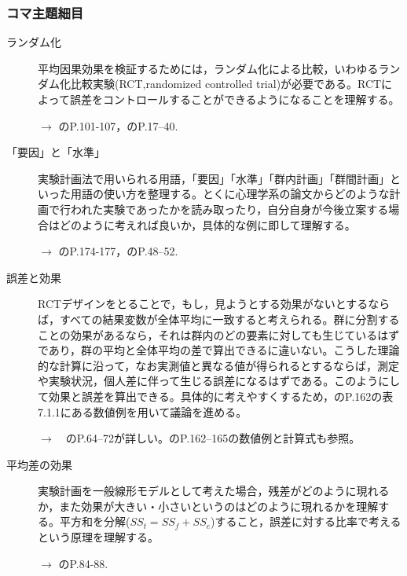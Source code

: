 \subsubsection{コマ主題細目}
\begin{description}
	\item[ランダム化]平均因果効果を検証するためには，ランダム化による比較，いわゆるランダム化比較実験(RCT,randomized controlled trial)が必要である。RCTによって誤差をコントロールすることができるようになることを理解する。
	      \begin{flushright}
		      $\to$ \citet{Nishiuchi201301}のP.101-107，\citet{Ohmura201301}のP.17--40.
	      \end{flushright}

	\item[「要因」と「水準」]実験計画法で用いられる用語，「要因」「水準」「群内計画」「群間計画」といった用語の使い方を整理する。とくに心理学系の論文からどのような計画で行われた実験であったかを読み取ったり，自分自身が今後立案する場合はどのように考えれば良いか，具体的な例に即して理解する。
	      \begin{flushright}
		      $\to$ \citet{Yamada2004}のP.174-177，\citet{Ohmura201301}のP.48--52.
	      \end{flushright}

	\item[誤差と効果]RCTデザインをとることで，もし，見ようとする効果がないとするならば，すべての結果変数が全体平均に一致すると考えられる。群に分割することの効果があるなら，それは群内のどの要素に対しても生じているはずであり，群の平均と全体平均の差で算出できるに違いない。こうした理論的な計算に沿って，なお実測値と異なる値が得られるとするならば，測定や実験状況，個人差に伴って生じる誤差になるはずである。このようにして効果と誤差を算出できる。具体的に考えやすくするため，\citet{Yamada2004}のP.162の表7.1.1にある数値例を用いて議論を進める。
	      \begin{flushright}
		      $\to$　\citet{Ohmura201301}のP.64--72が詳しい。\citet{Yamada2004}のP.162--165の数値例と計算式も参照。
	      \end{flushright}

	\item[平均差の効果]実験計画を一般線形モデルとして考えた場合，残差がどのように現れるか，また効果が大きい・小さいというのはどのように現れるかを理解する。平方和を分解($SS_t = SS_f+SS_e$)すること，誤差に対する比率で考えるという原理を理解する。
	      \begin{flushright}
		      $\to$ \citet{Ohmura201301}のP.84-88.
	      \end{flushright}


\end{description}
